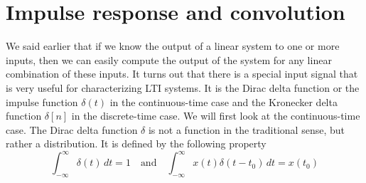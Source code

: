 \section{Impulse response and convolution}
We said earlier that if we know the output of a linear system to one or more inputs, then we can easily compute the output of the system for any linear combination of these inputs. It turns out that there is a special input signal that is very useful for characterizing LTI systems. It is the Dirac delta function or the impulse function $\delta\left(t\right)$ in the continuous-time case and the Kronecker delta function $\delta\left[n\right]$ in the discrete-time case. We will first look at the continuous-time case. The Dirac delta function $\delta$ is not a function in the traditional sense, but rather a distribution. It is defined by the following property
\begin{equation}
    \int_{-\infty}^{\infty} \delta\left(t\right) \, dt = 1 \quad \text{and} \quad \int_{-\infty}^{\infty} x\left(t\right)\delta\left(t - t_0\right) \, dt = x\left(t_0\right)
    \label{eq:04-05-delta-ct}
\end{equation}